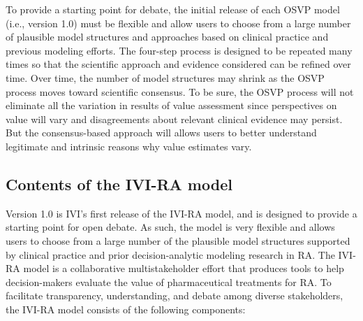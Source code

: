 \documentclass[11pt,final,fleqn]{article}\usepackage[]{graphicx}\usepackage[]{color}
\theoremstyle{plain}
\begin{document}
To provide a starting point for debate, the initial release of each OSVP model (i.e., version 1.0) must be flexible and allow users to choose from a large number of plausible model structures and approaches based on clinical practice and previous modeling efforts. The four-step process is designed to be repeated many times so that the scientific approach and evidence considered can be refined over time. Over time, the number of model structures may shrink as the OSVP process moves toward scientific consensus. To be sure, the OSVP process will not eliminate all the variation in results of value assessment since perspectives on value will vary and disagreements about relevant clinical evidence may persist. But the consensus-based approach will allows users to better understand legitimate and intrinsic reasons why value estimates vary.

\subsection*{Contents of the IVI-RA model}
Version 1.0 is IVI's first release of the IVI-RA model, and is designed to provide a starting point for open debate. As such, the model is very flexible and allows users to choose from a large number of the plausible model structures supported by clinical practice and prior decision-analytic modeling research in RA. The IVI-RA model is a collaborative multistakeholder effort that produces tools to help decision-makers evaluate the value of pharmaceutical treatments for RA. To facilitate transparency, understanding, and debate among diverse stakeholders, the IVI-RA model consists of the following components:
\end{document}
